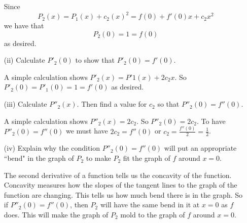 \begin{pa}
\begin{itemize}
\begin{activitySolution}

Since
\[P_2(x) = P_1(x) + c_2(x)^2 = f(0) + f'(0)x + c_2x^2\]
we have that
\[P_2(0) = 1 = f(0)\]
as desired.

\end{activitySolution}

  	\item[(ii)] Calculate $P'_2(0)$ to show that $P'_2(0) = f'(0)$.

\begin{activitySolution}

A simple calculation shows $P'_2(x) = P'1(x) + 2c_2x$. So $P'_2(0) = P'_1(0) = 1 = f'(0)$ as desired.

\end{activitySolution}

   	\item[(iii)] Calculate $P''_2(x)$. Then find a value for $c_2$ so that $P''_2(0) = f''(0)$.

\begin{activitySolution}

 A simple calculation shows $P''_2(x) = 2c_2$. So $P''_2(0) = 2c_2$. To have $P''_2(0) = f''(0)$ we must have $2c_2 = f''(0)$ or $c_2 = \frac{f''(0)}{2} = \frac{1}{2}$.

\end{activitySolution}

    \item[(iv)] Explain why the condition $P''_2(0) = f''(0)$ will put an appropriate ``bend" in the graph of $P_2$ to make $P_2$ fit the graph of $f$ around $x=0$.

\begin{activitySolution}

The second derivative of a function tells us the concavity of the function. Concavity measures how the slopes of the tangent lines to the graph of the function are changing. This tells us how much bend there is in the graph. So if  $P''_2(0) = f''(0)$, then $P_2$ will have the same bend in it at $x=0$ as $f$ does. This will make the graph of $P_2$ mold to the graph of $f$ around $x=0$.

\end{activitySolution}

    \end{itemize}

\ea

\end{pa}
\afterpa 